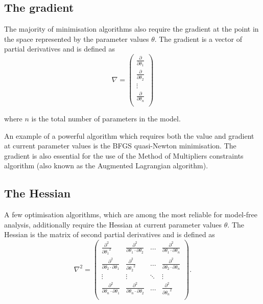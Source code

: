 \subsection{The gradient}

The majority of minimisation algorithms also require the gradient at the point in the space represented by the parameter values $\theta$.  The gradient is a vector of partial derivatives and is defined as
\begin{equation}
 \nabla = \begin{pmatrix}
  \frac{\partial}{\partial \theta_1} \\
  \frac{\partial}{\partial \theta_2} \\
  \vdots \\
  \frac{\partial}{\partial \theta_n} \\
 \end{pmatrix}
\end{equation}

\noindent where $n$ is the total number of parameters in the model.

An example of a powerful algorithm which requires both the value and gradient at current parameter values is the BFGS quasi-Newton minimisation.  The gradient is also essential for the use of the Method of Multipliers constraints algorithm (also known as the Augmented Lagrangian algorithm).


\subsection{The Hessian}

A few optimisation algorithms, which are among the most reliable for model-free analysis, additionally require the Hessian at current parameter values $\theta$.  The Hessian is the matrix of second partial derivatives and is defined as
\begin{equation}
 \nabla^2 = \begin{pmatrix}
  \frac{\partial^2}{{\partial \theta_1}^2}                       & \frac{\partial^2}{\partial \theta_1 \cdot \partial \theta_2}  & \ldots    & \frac{\partial^2}{\partial \theta_1 \cdot \partial \theta_n} \\
  \frac{\partial^2}{\partial \theta_2 \cdot \partial \theta_1} & \frac{\partial^2}{{\partial \theta_2}^2}                        & \ldots    & \frac{\partial^2}{\partial \theta_2 \cdot \partial \theta_n} \\
  \vdots                                                       & \vdots                                                        & \ddots    & \vdots \\
  \frac{\partial^2}{\partial \theta_n \cdot \partial \theta_1} & \frac{\partial^2}{\partial \theta_n \cdot \partial \theta_2}  & \ldots    & \frac{\partial^2}{{\partial \theta_n}^2} \\
 \end{pmatrix}.
\end{equation}

